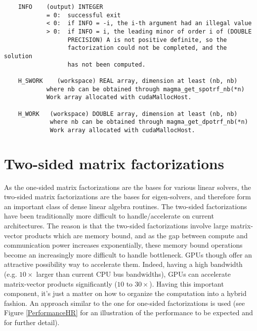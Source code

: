 \documentclass[10pt]{book}
\begin{document}
\begin{verbatim}
    INFO    (output) INTEGER
            = 0:  successful exit
            < 0:  if INFO = -i, the i-th argument had an illegal value
            > 0:  if INFO = i, the leading minor of order i of (DOUBLE
                  PRECISION) A is not positive definite, so the
                  factorization could not be completed, and the solution
                  has not been computed.

    H_SWORK    (workspace) REAL array, dimension at least (nb, nb)
            where nb can be obtained through magma_get_spotrf_nb(*n)
            Work array allocated with cudaMallocHost.

    H_WORK   (workspace) DOUBLE array, dimension at least (nb, nb)
             where nb can be obtained through magma_get_dpotrf_nb(*n)
             Work array allocated with cudaMallocHost.
\end{verbatim}

\normalsize
\newpage
\section{Two-sided matrix factorizations}

\vspace{0.1in}
As the one-sided matrix factorizations are the bases for various linear 
solvers, the two-sided matrix factorizations are the bases for eigen-solvers,
and therefore form an important class of dense linear algebra routines.
The two-sided factorizations have been traditionally more difficult to 
handle/accelerate on current architectures. The reason is that the two-sided
factorizations involve large matrix-vector products which are memory bound,
and as the gap between compute and communication power increases exponentially,
these memory bound operations become an increasingly more difficult to handle
bottleneck. GPUs though offer an attractive possibility way to accelerate them.
Indeed, having a high bandwidth (e.g. $10 \times$ larger than current CPU
bus bandwidths), GPUs can accelerate matrix-vector products significantly 
($10$ to $30 \times$). Having this important component, it's just a matter 
on how to organize the computation into a hybrid fashion. An approach
similar to the one for one-sided factorizations is used (see Figure
\ref{PerformanceHR} for an illustration of the performance to be expected 
and \cite{lawn219} for further detail).
\end{document}
